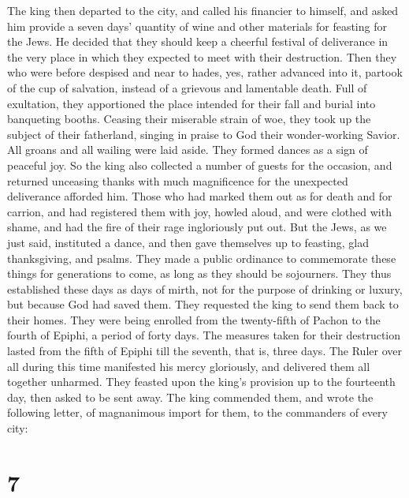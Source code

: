  The king then departed to the city, and called his
financier to himself, and asked him provide a seven days' quantity of
wine and other materials for feasting for the Jews. He decided that they
should keep a cheerful festival of deliverance in the very place in
which they expected to meet with their destruction.  Then
they who were before despised and near to hades, yes, rather advanced
into it, partook of the cup of salvation, instead of a grievous and
lamentable death. Full of exultation, they apportioned the place
intended for their fall and burial into banqueting booths.
 Ceasing their miserable strain of woe, they took up the
subject of their fatherland, singing in praise to God their
wonder-working Savior. All groans and all wailing were laid aside. They
formed dances as a sign of peaceful joy.  So the king
also collected a number of guests for the occasion, and returned
unceasing thanks with much magnificence for the unexpected deliverance
afforded him.  Those who had marked them out as for death
and for carrion, and had registered them with joy, howled aloud, and
were clothed with shame, and had the fire of their rage ingloriously put
out.  But the Jews, as we just said, instituted a dance,
and then gave themselves up to feasting, glad thanksgiving, and psalms.
 They made a public ordinance to commemorate these things
for generations to come, as long as they should be sojourners. They thus
established these days as days of mirth, not for the purpose of drinking
or luxury, but because God had saved them.  They
requested the king to send them back to their homes. 
They were being enrolled from the twenty-fifth of Pachon to the fourth
of Epiphi, a period of forty days. The measures taken for their
destruction lasted from the fifth of Epiphi till the seventh, that is,
three days.  The Ruler over all during this time
manifested his mercy gloriously, and delivered them all together
unharmed.  They feasted upon the king's provision up to
the fourteenth day, then asked to be sent away.  The king
commended them, and wrote the following letter, of magnanimous import
for them, to the commanders of every city:

\hypertarget{section-6}{%
\section{7}\label{section-6}}


